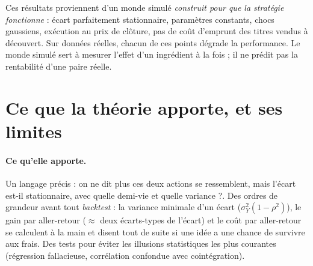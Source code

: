 \begin{pitfall}
Ces résultats proviennent d'un monde simulé \emph{construit pour que la stratégie fonctionne} : écart parfaitement stationnaire, paramètres constants, chocs gaussiens, exécution au prix de clôture, pas de coût d'emprunt des titres vendus à découvert. Sur données réelles, chacun de ces points dégrade la performance. Le monde simulé sert à mesurer l'effet d'un ingrédient à la fois ; il ne prédit pas la rentabilité d'une paire réelle.
\end{pitfall}

\section{Ce que la théorie apporte, et ses limites}

\paragraph{Ce qu'elle apporte.} Un langage précis : on ne dit plus \og ces deux actions se ressemblent\fg, mais \og l'écart est-il stationnaire, avec quelle demi-vie et quelle variance ?\fg. Des ordres de grandeur avant tout \emph{backtest} : la variance minimale d'un écart ($\sigma_Y^2(1-\rho^2)$), le gain par aller-retour ($\approx$ deux écarts-types de l'écart) et le coût par aller-retour se calculent à la main et disent tout de suite si une idée a une chance de survivre aux frais. Des tests pour éviter les illusions statistiques les plus courantes (régression fallacieuse, corrélation confondue avec cointégration).

